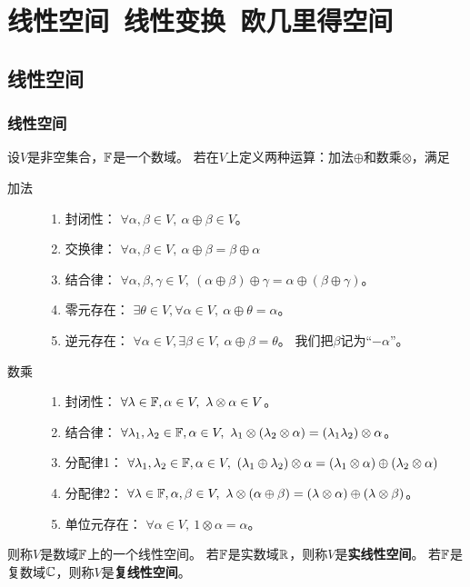 \chapter{线性空间\ 线性变换\ 欧几里得空间}

\section{线性空间}

\subsection{线性空间}
\begin{definition}[线性空间]
  设$V$是非空集合，$\mathbb{F}$是一个数域。
  若在$V$上定义两种运算：加法$\oplus$和数乘$\otimes$，满足
  \begin{description}
    \item[加法]
    \begin{enumerate}
      \item 封闭性：
      $\forall\alpha,\beta\in V,\ \alpha\oplus\beta\in V$。
      \item 交换律：
      $\forall\alpha,\beta\in V,\ \alpha\oplus\beta = \beta\oplus\alpha$
      \item 结合律：
      $\forall\alpha,\beta,\gamma\in V,\ 
        (\alpha\oplus\beta)\oplus\gamma = \alpha\oplus(\beta\oplus\gamma)$。
      \item 零元存在：
      $\exists\theta\in V,\forall\alpha\in V,\ \alpha\oplus\theta=\alpha$。
      \item 逆元存在：
      $\forall\alpha\in V,\exists\beta\in V,\ \alpha\oplus\beta=\theta$。
      我们把$\beta$记为``$-\alpha$''。
    \end{enumerate}  
    \item[数乘]
    \begin{enumerate}
      \item 封闭性：
      $\forall\lambda\in\mfF,\alpha\in V,\ \lambda\otimes\alpha\in V$。
      \item 结合律：
      $\forall\lambda_1,\lambda_2\in\mfF,\alpha\in V,\ 
        \lambda_1\otimes(\lambda_2\otimes\alpha) =
        (\lambda_1\lambda_2)\otimes\alpha$。
      \item 分配律1：
      $\forall\lambda_1,\lambda_2\in\mfF,\alpha\in V,\ 
        (\lambda_1\oplus\lambda_2)\otimes\alpha =
        (\lambda_1\otimes\alpha)\oplus(\lambda_2\otimes\alpha)$
      \item 分配律2：
      $\forall\lambda\in\mfF,\alpha,\beta\in V,\ 
        \lambda\otimes(\alpha\oplus\beta) =
        (\lambda\otimes\alpha)\oplus(\lambda\otimes\beta)$。
      \item 单位元存在：
      $\forall\alpha\in V,\ 
        1\otimes\alpha = \alpha$。
    \end{enumerate}
  \end{description}
  则称$V$是数域$\mathbb{F}$上的一个线性空间。
  若$\mathbb{F}$是实数域$\mathbb{R}$，则称$V$是\textbf{实线性空间}。
  若$\mathbb{F}$是复数域$\mathbb{C}$，则称$V$是\textbf{复线性空间}。
\end{definition}

